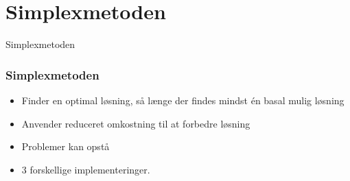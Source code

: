 
\section{Simplexmetoden}
\begin{frame}
\centering
\Huge
Simplexmetoden
\end{frame}
%
\begin{frame}
\frametitle{Simplexmetoden}
\begin{itemize}
\item Finder en optimal løsning, så længe der findes mindst én basal mulig løsning
\item Anvender reduceret omkostning til at forbedre løsning
\item Problemer kan opstå
\item 3 forskellige implementeringer.
\end{itemize}
\end{frame}